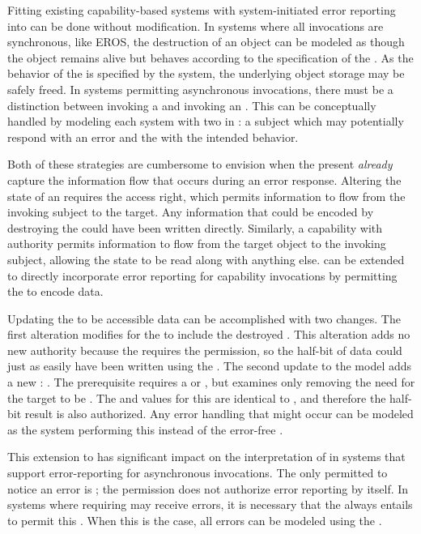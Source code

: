 Fitting existing capability-based systems with system-initiated error reporting into \TMmodelName{} can be done without modification.
In systems where all invocations are synchronous, like EROS, the destruction of an object can be modeled as though the object remains alive but behaves according to the specification of the \term{\TMvoid{} \TMobj{}}.
As the behavior of the \TMvoid{} \TMobj{} is specified by the system, the underlying object storage may be safely freed.
In systems permitting asynchronous invocations, there must be a distinction between invoking a \TMcap{} and invoking an \TMobj{}.
This can be conceptually handled by modeling each system \TMobj{} with two \TMobjs{} in \TMmodelName{}: a subject which may potentially respond with an error and the \TMobj{} with the intended behavior.

Both of these strategies are cumbersome to envision when the \TMcaps{} present \emph{already} capture the information flow that occurs during an error response.
Altering the state of an \TMobj{} requires the \COQwr{} access right, which permits information to flow from the invoking subject to the target.
Any information that could be encoded by destroying the \TMobj{} could have been written directly.
Similarly, a capability with \COQrd{} authority permits information to flow from the target object to the invoking subject, allowing the \TMobj{} state to be read along with anything else.
\xmakefirstuc{\TMmodelName} can be extended to directly incorporate error reporting for capability invocations by permitting the \TMobjLabel{} to encode data.

Updating the \TMobjLabel{} to be accessible data can be accomplished with two changes.
The first alteration modifies \COQwroteTo{} for the \COQdestroy{} \TMop{} to include the destroyed \TMobj{}.
This alteration adds no new authority because the \COQdestroy{} \TMop{} requires the \COQwr{} permission, so the half-bit of data could just as easily have been written using the \COQwrite{} \TMop{}.
The second update to the model adds a new \TMop{}: .
The  \TMop{} prerequisite requires a \COQwk{} or \COQrd{} \TMcap{}, but examines only \COQpreReqCommon{} removing the need for the target to be \TMalive.
The \COQreadFrom{} and \COQwroteTo{} values for this \TMop{} are identical to \COQread{}, and therefore the half-bit result is also authorized.
Any error handling that might occur can be modeled as the system performing this \TMop{} instead of the error-free \TMops{}.

This extension to \TMmodelName{} has significant impact on the interpretation of \TMaccessRights{} in systems that support error-reporting for asynchronous invocations.
The only \TMaccessRight{} permitted to notice an error is \COQrd{}; the \COQwr{} permission does not authorize error reporting by itself.
In systems where \TMops{} requiring \COQwr{} may receive errors, it is necessary that the \COQwr{} always entails \COQrd{} to permit this \TMop{}.
When this is the case, all errors can be modeled using the  \TMop{}.

